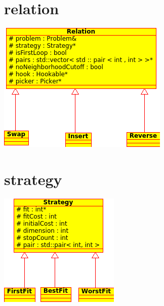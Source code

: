 \documentclass[a4paper,10pt]{report}
\begin{document}
\section{relation}
\includegraphics[width=\textwidth]{../UML/relation-simple.png}

\section{strategy}
\includegraphics[width=\textwidth]{../UML/strategy-simple.png}
\end{document}
